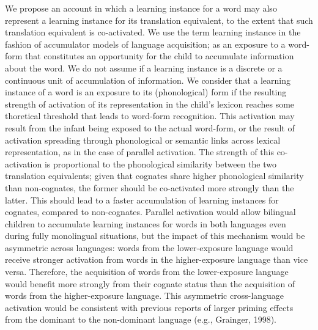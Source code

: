 \documentclass[
  12pt,
  b5paperpaper,
  twoside]{scrreprt}
\begin{document}
We propose an account in which a learning instance for a word may also
represent a learning instance for its translation equivalent, to the
extent that such translation equivalent is co-activated. We use the term
learning instance in the fashion of accumulator models of language
acquisition; as an exposure to a word-form that constitutes an
opportunity for the child to accumulate information about the word. We
do not assume if a learning instance is a discrete or a continuous unit
of accumulation of information. We consider that a learning instance of
a word is an exposure to its (phonological) form if the resulting
strength of activation of its representation in the child's lexicon
reaches some thoretical threshold that leads to word-form recognition.
This activation may result from the infant being exposed to the actual
word-form, or the result of activation spreading through phonological or
semantic links across lexical representation, as in the case of parallel
activation. The strength of this co-activation is proportional to the
phonological similarity between the two translation equivalents; given
that cognates share higher phonological similarity than non-cognates,
the former should be co-activated more strongly than the latter. This
should lead to a faster accumulation of learning instances for cognates,
compared to non-cognates. Parallel activation would allow bilingual
children to accumulate learning instances for words in both languages
even during fully monolingual situations, but the impact of this
mechanism would be asymmetric across languages: words from the
lower-exposure language would receive stronger activation from words in
the higher-exposure language than vice versa. Therefore, the acquisition
of words from the lower-exposure language would benefit more strongly
from their cognate status than the acquisition of words from the
higher-exposure language. This asymmetric cross-language activation
would be consistent with previous reports of larger priming effects from
the dominant to the non-dominant language (e.g., Grainger, 1998).
\end{document}
